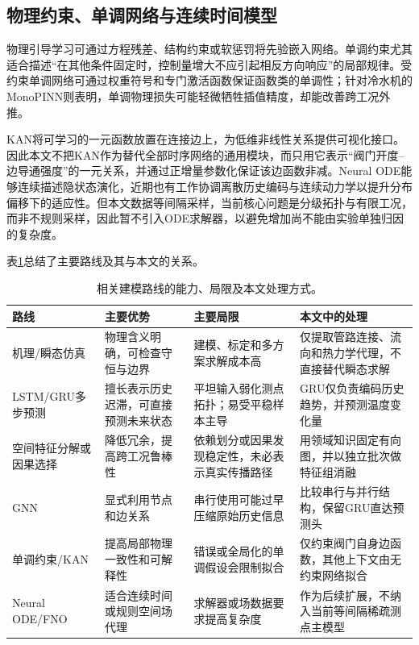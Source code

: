 \documentclass[a4paper,fleqn]{cas-dc}
\begin{document}
\subsection{物理约束、单调网络与连续时间模型}

物理引导学习可通过方程残差、结构约束或软惩罚将先验嵌入网络\citep{raissi2019pinn}。单调约束尤其适合描述“在其他条件固定时，控制量增大不应引起相反方向响应”的局部规律。受约束单调网络可通过权重符号和专门激活函数保证函数类的单调性\citep{runje2023monotonic}；针对冷水机的MonoPINN则表明，单调物理损失可能轻微牺牲插值精度，却能改善跨工况外推\citep{tang2026monopinn}。

KAN将可学习的一元函数放置在连接边上，为低维非线性关系提供可视化接口\citep{liu2025kan}。因此本文不把KAN作为替代全部时序网络的通用模块，而只用它表示“阀门开度--边导通强度”的一元关系，并通过正增量参数化保证该边函数非减。Neural ODE能够连续描述隐状态演化\citep{chen2018neuralode}，近期也有工作协调离散历史编码与连续动力学以提升分布偏移下的适应性\citep{li2026npc}。但本文数据等间隔采样，当前核心问题是分级拓扑与有限工况，而非不规则采样，因此暂不引入ODE求解器，以避免增加尚不能由实验单独归因的复杂度。

表\ref{tab:literature}总结了主要路线及其与本文的关系。

\begin{table}[t]
\centering
\caption{相关建模路线的能力、局限及本文处理方式。}
\label{tab:literature}
\begin{tabularx}{\textwidth}{@{}p{2.6cm}p{3.4cm}p{4.0cm}X@{}}
\toprule
路线 & 主要优势 & 主要局限 & 本文中的处理 \\
\midrule
机理/瞬态仿真 & 物理含义明确，可检查守恒与边界 & 建模、标定和多方案求解成本高 & 仅提取管路连接、流向和热力学代理，不直接替代瞬态求解 \\
LSTM/GRU多步预测 & 擅长表示历史迟滞，可直接预测未来状态 & 平坦输入弱化测点拓扑；易受平稳样本主导 & GRU仅负责编码历史趋势，并预测温度变化量 \\
空间特征分解或因果选择 & 降低冗余，提高跨工况鲁棒性 & 依赖划分或因果发现稳定性，未必表示真实传播路径 & 用领域知识固定有向图，并以独立批次做特征组消融 \\
GNN & 显式利用节点和边关系 & 串行使用可能过早压缩原始历史信息 & 比较串行与并行结构，保留GRU直达预测头 \\
单调约束/KAN & 提高局部物理一致性和可解释性 & 错误或全局化的单调假设会限制拟合 & 仅约束阀门自身边函数，其他上下文由无约束网络拟合 \\
Neural ODE/FNO & 适合连续时间或规则空间场代理 & 求解器或场数据要求提高复杂度 & 作为后续扩展，不纳入当前等间隔稀疏测点主模型 \\
\bottomrule
\end{tabularx}
\end{table}
\end{document}
